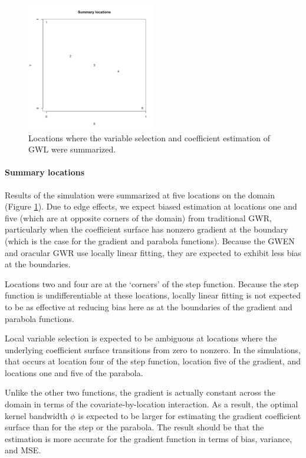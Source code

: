 \documentclass[authoryear, review, 11pt]{elsarticle}
\begin{document}
	\begin{figure}
		\begin{center}
			\includegraphics[width=0.5\textwidth]{../../figures/simulation/summary-locations.pdf}
			\caption{Locations where the variable selection and coefficient estimation of GWL were summarized.\label{fig:summary-locations}}
		\end{center}
	\end{figure}
	
	\paragraph{Summary locations}Results of the simulation were summarized at five locations on the domain (Figure \ref{fig:summary-locations}). Due to edge effects, we expect biased estimation at locations one and five (which are at opposite corners of the domain) from traditional GWR, particularly when the coefficient surface has nonzero gradient at the boundary (which is the case for the gradient and parabola functions). Because the GWEN and oracular GWR use locally linear fitting, they are expected to exhibit less bias at the boundaries.
	
	Locations two and four are at the `corners' of the step function. Because the step function is undifferentiable at these locations, locally linear fitting is not expected to be as effective at reducing bias here as at the boundaries of the gradient and parabola functions.
	
	Local variable selection is expected to be ambiguous at locations where the underlying coefficient surface transitions from zero to nonzero. In the simulations, that occurs at location four of the step function, location five of the gradient, and locations one and five of the parabola.
	
	Unlike the other two functions, the gradient is actually constant across the domain in terms of the covariate-by-location interaction. As a result, the optimal kernel bandwidth $\phi$ is expected to be larger for estimating the gradient coefficient surface than for the step or the parabola. The result should be that the estimation is more accurate for the gradient function in terms of bias, variance, and MSE.
		
\end{document}
